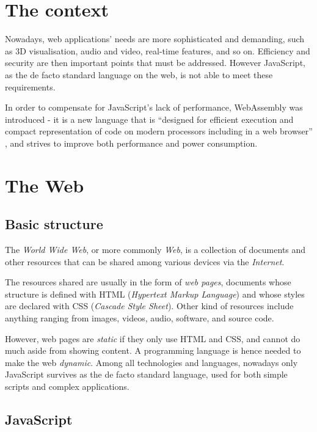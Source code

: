 \section{The context}

Nowadays, web applications' needs are more sophisticated and demanding, such as 3D visualisation, audio and video,
real-time features, and so on. Efficiency and security are then important points that must be addressed. However JavaScript,
as the de facto standard language on the web, is not able to meet these requirements.

In order to compensate for JavaScript's lack of performance, WebAssembly was introduced -
it is a new language that is ``designed for efficient execution and compact representation of code
on modern processors including in a web browser'' \cite{wasm-w3c-announcement}, and strives to improve
both performance and power consumption.

\section{The Web}

\subsection{Basic structure}

The \textit{World Wide Web}, or more commonly \textit{Web}, is a collection of documents and other resources
that can be shared among various devices via the \textit{Internet}.

The resources shared are usually in the form of \textit{web pages}, documents whose structure is defined with HTML
(\textit{Hypertext Markup Language}) and whose styles are declared with CSS (\textit{Cascade Style Sheet}).
Other kind of resources include anything ranging from images, videos, audio, software, and source code.

However, web pages are \textit{static} if they only use HTML and CSS, and cannot do much aside from showing content. A programming
language is hence needed to make the web \textit{dynamic}. Among all technologies and languages, nowadays
only JavaScript survives as the de facto standard language, used for both simple scripts and complex applications.

\subsection{JavaScript}
\label{sec:introduction-javascript}

